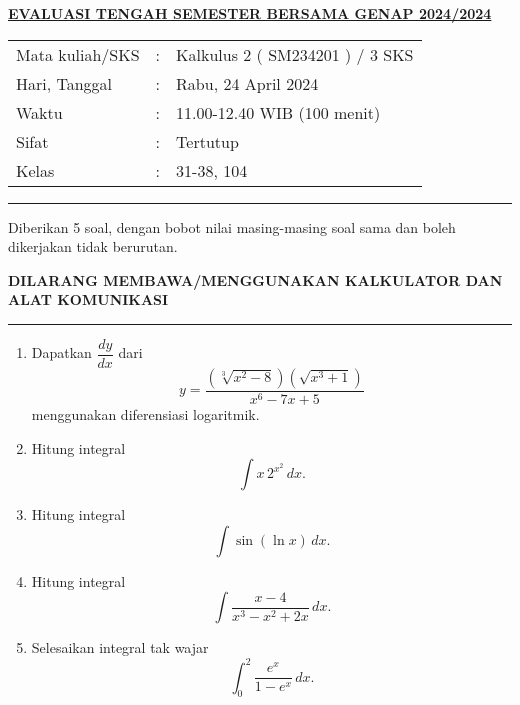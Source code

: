 \documentclass[11pt,openany,a4paper]{article}
\begin{document}
    \newpage
    \pagestyle{problems}
    
    \begin{center}
	{\underline{\textbf{\MakeUppercase{Evaluasi Tengah Semester Bersama Genap 2024/2024}}}}
    \end{center}

    \begin{center}
	\begin{tabular}{lcl}
		Mata kuliah/SKS & : & Kalkulus 2 ( SM234201 ) / 3 SKS\\
		Hari, Tanggal & : & Rabu, 24 April 2024\\
		Waktu & : & 11.00-12.40 WIB (100 menit)\\
		Sifat & : & Tertutup\\
		Kelas & : & 31-38, 104
	\end{tabular}
    \end{center}
	
    \noindent\rule{\textwidth}{2.pt}
	
    \setlength{\parindent}{5pt}
    \par Diberikan 5 soal, dengan bobot nilai masing-masing soal sama dan boleh dikerjakan tidak berurutan.
    \setlength{\parindent}{5pt}
    \setlength{\parindent}{5pt}
    {\small
    \par \textbf{\MakeUppercase{Dilarang membawa/menggunakan kalkulator dan alat komunikasi}}
    }
    \par {}
	
    \noindent\rule{\textwidth}{2.pt}
	
\begin{enumerate}
  \item Dapatkan \( \dfrac{dy}{dx} \) dari 
  \[
  y = \frac{\left(\sqrt[3]{x^2 - 8}\right)\left(\sqrt{x^3 + 1}\right)}{x^6 - 7x + 5}
  \]
  menggunakan diferensiasi logaritmik.
  
  \item Hitung integral
  \[
  \int x \, 2^{x^2} \, dx.
  \]
  
  \item Hitung integral
  \[
  \int \sin(\ln x) \, dx.
  \]
  
  \item Hitung integral
  \[
  \int \frac{x - 4}{x^3 - x^2 + 2x} \, dx.
  \]
  
  \item Selesaikan integral tak wajar
  \[
  \int_0^2 \frac{e^x}{1 - e^x} \, dx.
  \]
\end{enumerate}
	
\end{document}
